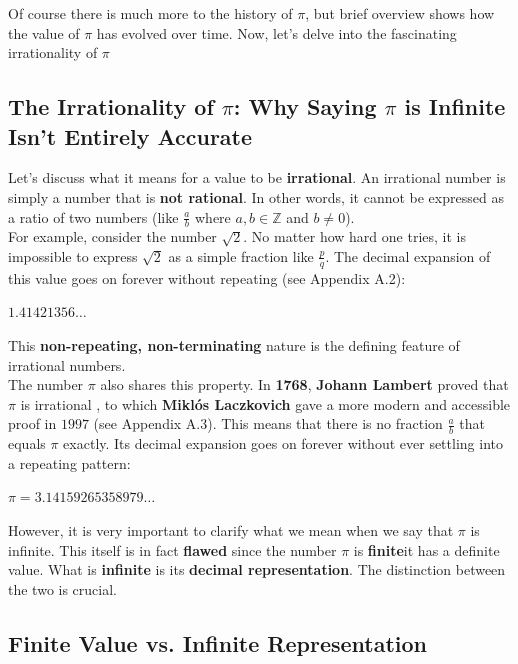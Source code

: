\documentclass[12pt]{article}
\begin{document}
\noindent Of course there is much more to the history of
$\pi$, but brief overview shows how the value of $\pi$ has evolved over time. Now, let's delve into the fascinating irrationality of $\pi$

\subsection{The Irrationality of $\pi$: Why Saying $\pi$ is Infinite Isn't Entirely Accurate}

\noindent Let's discuss what it means for a value to be \textbf{irrational}. An irrational number is simply a number that is \textbf{not rational}. In other words, it cannot be expressed as a ratio of two numbers (like $\frac{a}{b}$ where $a,b \in \mathbb{Z}$ and $b \neq 0$).\\

\noindent For example, consider the number $\sqrt{2}$. No matter how hard one tries, it is impossible to express $\sqrt{2}$ as a simple fraction like $\frac{p}{q}$. The decimal expansion of this value goes on forever without repeating (see Appendix A.2):
\begin{center}
    $1.41421356\ldots$
\end{center}
This \textbf{non-repeating, non-terminating} nature is the defining feature of irrational numbers.\\

\noindent The number $\pi$ also shares this property. In \textbf{1768}, \textbf{Johann Lambert} proved that $\pi$ is irrational \cite{Denis}, to which \textbf{Miklós Laczkovich} gave a more modern and accessible proof in $1997$ (see Appendix A.3). This means that there is no fraction $\frac{a}{b}$ that equals $\pi$ exactly. Its decimal expansion goes on forever without ever settling into a repeating pattern:
\begin{center}
    $\pi = 3.14159265358979\ldots$
\end{center}

\noindent However, it is very important to clarify what we mean when we say that $\pi$ is infinite. This itself is in fact \textbf{flawed} since the number $\pi$ is \textbf{finite}\textendash it has a definite value. What is \textbf{infinite} is its \textbf{decimal representation}. The distinction between the two is crucial.

\subsection{Finite Value vs. Infinite Representation}
\end{document}
